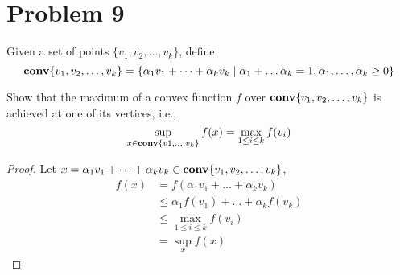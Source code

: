 \documentclass[11pt]{article}
\begin{document}
\clearpage
\section*{Problem 9}
Given a set of points $\{v_1, v_2, \dots, v_k\}$, define
\[
\mathop {\textbf{conv}}\{v_1, v_2, \dots, v_k\} = \{\alpha_1 v_1 + \dots + \alpha_k v_k\mid \alpha_1 + \dots \alpha_k = 1, \alpha_1, \dots, \alpha_k \geq 0\}
\]

Show that the maximum of a convex function $f$ over $\mathop {\textbf{conv}}\{v_1, v_2, \dots, v_k\}$ is achieved at one of its vertices, i.e.,
\[
\sup_{x\in\mathop {\textbf{conv}}\{v1, \dots, v_k\}} f(x) = \max_{1\leq i \leq k} f(v_i)
\]

\begin{proof}
  Let $x = \alpha_1 v_1 + \dots + \alpha_k v_k \in \mathop {\textbf{conv}}\{v_1, v_2, \dots, v_k\}$,
  \begin{align*}
    f(x) 
    &= f(\alpha_1 v_1 + \dots + \alpha_k v_k)\\
    &\leq \alpha_1 f(v_1) + \dots + \alpha_k f(v_k)\\
    &\leq \max_{1\leq i \leq k} f(v_i)\\
    &=\sup_x f(x)
  \end{align*}
\end{proof}
\end{document}
